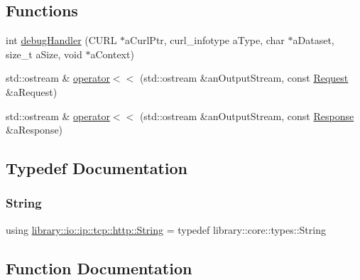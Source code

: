 \subsection*{Functions}
\begin{DoxyCompactItemize}
\item 
int \hyperlink{namespacelibrary_1_1io_1_1ip_1_1tcp_1_1http_aaa7adb72f13ba15a0b4bd03152b8c516}{debug\+Handler} (C\+U\+RL $\ast$a\+Curl\+Ptr, curl\+\_\+infotype a\+Type, char $\ast$a\+Dataset, size\+\_\+t a\+Size, void $\ast$a\+Context)
\item 
std\+::ostream \& \hyperlink{namespacelibrary_1_1io_1_1ip_1_1tcp_1_1http_add264b969711b177e74280f190aff9ef}{operator$<$$<$} (std\+::ostream \&an\+Output\+Stream, const \hyperlink{classlibrary_1_1io_1_1ip_1_1tcp_1_1http_1_1_request}{Request} \&a\+Request)
\item 
std\+::ostream \& \hyperlink{namespacelibrary_1_1io_1_1ip_1_1tcp_1_1http_a242e1bfe1e53cc6a8f0bc10e7d7e2ad3}{operator$<$$<$} (std\+::ostream \&an\+Output\+Stream, const \hyperlink{classlibrary_1_1io_1_1ip_1_1tcp_1_1http_1_1_response}{Response} \&a\+Response)
\end{DoxyCompactItemize}


\subsection{Typedef Documentation}
\mbox{\label{namespacelibrary_1_1io_1_1ip_1_1tcp_1_1http_a1c435ea1e3614d52139da88a36632815}} 
\subsubsection{\texorpdfstring{String}{String}}
{\footnotesize\ttfamily using \hyperlink{namespacelibrary_1_1io_1_1ip_1_1tcp_1_1http_a1c435ea1e3614d52139da88a36632815}{library\+::io\+::ip\+::tcp\+::http\+::\+String} = typedef library\+::core\+::types\+::\+String}



\subsection{Function Documentation}
\mbox{\label{namespacelibrary_1_1io_1_1ip_1_1tcp_1_1http_aaa7adb72f13ba15a0b4bd03152b8c516}} 

